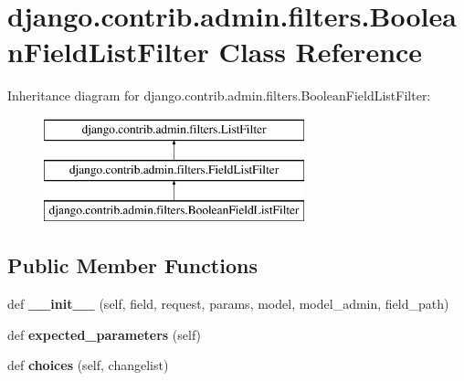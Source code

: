 \hypertarget{classdjango_1_1contrib_1_1admin_1_1filters_1_1_boolean_field_list_filter}{}\section{django.\+contrib.\+admin.\+filters.\+Boolean\+Field\+List\+Filter Class Reference}
\label{classdjango_1_1contrib_1_1admin_1_1filters_1_1_boolean_field_list_filter}
Inheritance diagram for django.\+contrib.\+admin.\+filters.\+Boolean\+Field\+List\+Filter\+:\begin{figure}[H]
\begin{center}
\leavevmode
\includegraphics[height=3.000000cm]{classdjango_1_1contrib_1_1admin_1_1filters_1_1_boolean_field_list_filter}
\end{center}
\end{figure}
\subsection*{Public Member Functions}
\begin{DoxyCompactItemize}
\item 
\mbox{\label{classdjango_1_1contrib_1_1admin_1_1filters_1_1_boolean_field_list_filter_a6bcfd54247f9462ca672f3e07fd5ed77}} 
def {\bfseries \+\_\+\+\_\+init\+\_\+\+\_\+} (self, field, request, params, model, model\+\_\+admin, field\+\_\+path)
\item 
\mbox{\label{classdjango_1_1contrib_1_1admin_1_1filters_1_1_boolean_field_list_filter_a76b099a845e2979c53dc7ec28b04a1dc}} 
def {\bfseries expected\+\_\+parameters} (self)
\item 
\mbox{\label{classdjango_1_1contrib_1_1admin_1_1filters_1_1_boolean_field_list_filter_a67285505cfd91a1bcbacad9930bab7cc}} 
def {\bfseries choices} (self, changelist)
\end{DoxyCompactItemize}
